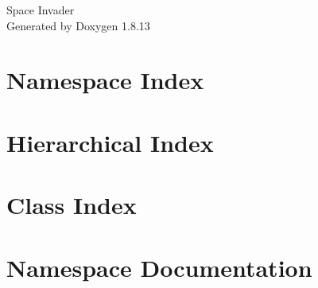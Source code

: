 \documentclass[twoside]{book}
\newcommand{\+}{\discretionary{\mbox{\scriptsize$\hookleftarrow$}}{}{}}
\newcommand{\clearemptydoublepage}{%
  \newpage{\pagestyle{empty}\cleardoublepage}%
}
\begin{document}
\hypersetup{pageanchor=false,
             bookmarksnumbered=true,
             pdfencoding=unicode
            }
\begin{titlepage}
\vspace*{7cm}
\begin{center}%
{\Large Space Invader }\\
\vspace*{1cm}
{\large Generated by Doxygen 1.8.13}\\
\end{center}
\end{titlepage}
\clearemptydoublepage
{}
\tableofcontents
\clearemptydoublepage
{}
\hypersetup{pageanchor=true}

\chapter{Namespace Index}

\chapter{Hierarchical Index}

\chapter{Class Index}

\chapter{Namespace Documentation}

\end{document}
